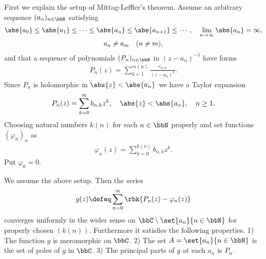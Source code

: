 \documentclass[openany, a4paper, oneside]{jsbook}
\begin{document}
First we explain the setup of Mittag-Leffler's theorem.
Assume an arbitrary sequence $(a_n)_{n \in \bbN}$ satisfying
\begin{gather}
 \abs{a_0} \leq \abs{a_1} \leq \cdots \leq \abs{a_n} \leq \abs{a_{n+1}} \leq \cdots, \quad \lim_{n \to \infty} \abs{a_n} = \infty, \\
 a_n \neq a_m \quad (n \neq m),
\end{gather}
and that a sequence of polynomials $(P_n)_{n \in \bbN}$ in $(z - a_n)^{-1}$ have forms
\begin{align}
 P_n (z)
 =
 \sum_{k=1}^{m (n)} \frac{c_{n,k}}{(z - a_n)^k}.
\end{align}
Since $P_n$ is holomorphic in $\abs{z} < \abs{a_n}$ we have a Taylor expansion
\begin{align}
 P_n (z)
 =
 \sum_{k=0}^{\infty} b_{n,k} z^k, \quad \abs{z} < \abs{a_n}, \quad n \geq 1.
\end{align}
Choosing natural numbers $k (n)$ for each $n \in \bbN$ properly and set functions $(\varphi_n)_n$ as
\begin{align}
 \varphi_n (z)
 =
 \sum_{k=0}^{k (n)} b_{n, k} z^k.
\end{align}
Put $\varphi_0 = 0$.
\begin{thm}
 We assume the above setup.
 Then the series
 \begin{align}
  g (z)
  \defeq
  \sum_{n=0}^{\infty} \rbk{P_n (z) - \varphi_n (z)}
 \end{align}
 converges uniformly in the wider sense on $\bbC \setminus \set{a_n}{n \in \bbN}$ for properly chosen $(k (n))$.
 Furthermore it satisfies the following properties.
 1) The function $g$ is meromorphic on $\bbC$.
 2) The set $A = \set{a_n}{n \in \bbN}$ is the set of poles of $g$ in $\bbC$.
 3) The principal parts of $g$ at each $a_n$ is $P_n$.
\end{thm}
\end{document}
